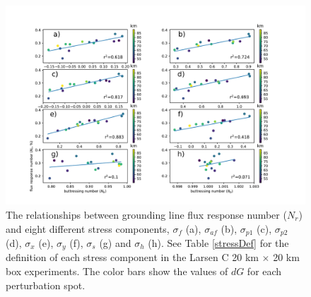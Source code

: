 \documentclass[review,oneside]{igs}
\begin{document}
\begin{figure}
\centering
\includegraphics[width=1\linewidth]{figs/diffStressCompAvgL.pdf}
\caption{The relationships between grounding line flux response number ($N_r$) and eight different stress components, $\sigma_f$ (a), $\sigma_{af}$ (b), $\sigma_{p1}$ (c), $\sigma_{p2}$ (d), $\sigma_{x}$ (e), $\sigma_{y}$ (f), $\sigma_{s}$ (g) and $\sigma_h$ (h). See Table \ref{stressDef} for the definition of each stress component in the Larsen C 20 km $\times$ 20 km box experiments. The color bars show the values of $dG$ for each perturbation spot.}
\label{diffStressCompAvgL}
\end{figure}


\end{document}
